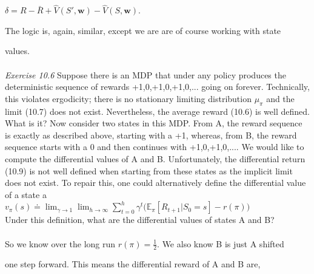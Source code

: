 \documentclass{article}
\begin{document}
$\delta = R - \bar{R} + \hat{V}(S', \mathbf{w}) - \hat{V}(S, \mathbf{w}).$

The logic is, again, similar, except we are are of course working with state 

values.
\\\\
\textit{Exercise 10.6} Suppose there is an MDP that under any policy produces the deterministic sequence of rewards +1,0,+1,0,+1,0,... going on forever. Technically, this violates
ergodicity; there is no stationary limiting distribution $\mu_{\pi}$ and the limit (10.7) does not
exist. Nevertheless, the average reward (10.6) is well defined. What is it? Now consider
two states in this MDP. From A, the reward sequence is exactly as described above,
starting with a +1, whereas, from B, the reward sequence starts with a 0 and then
continues with +1,0,+1,0,.... We would like to compute the differential values of A and
B. Unfortunately, the differential return (10.9) is not well defined when starting from
these states as the implicit limit does not exist. To repair this, one could alternatively
define the differential value of a state a
\\

$v_{\pi}(s) \doteq \lim_{\gamma \to 1} \lim_{h \to \infty} \sum_{t=0}^{h} \gamma^t \Big( \mathbb{E}_{\pi}[R_{t+1} | S_0 = s] - r(\pi) \Big)$
\\
Under this definition, what are the differential values of states A and B?
\\
\\

So we know over the long run $r(\pi) = \frac{1}{2}$. We also know B is just A shifted 

one step forward. This means the differential reward of A and B are, 
\end{document}
